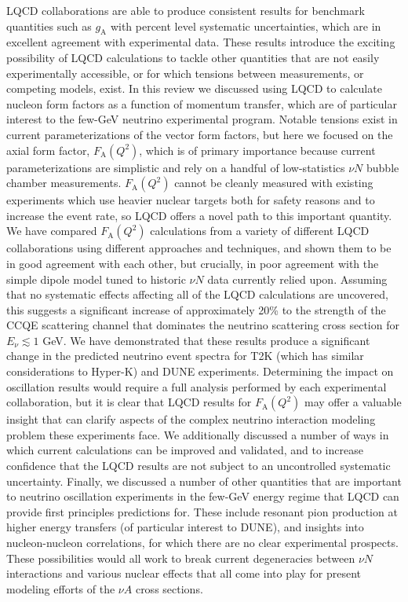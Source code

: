 LQCD collaborations are able to produce consistent results for benchmark quantities such as $g_{\mathrm{A}}$ with percent level systematic uncertainties, which are in excellent agreement with experimental data.
These results introduce the exciting possibility of LQCD calculations to tackle other quantities that are not easily experimentally accessible, or for which tensions between measurements, or competing models, exist.
In this review we discussed using LQCD to calculate nucleon form factors as a function of momentum transfer, which are of particular interest to the few-GeV neutrino experimental program.
Notable tensions exist in current parameterizations of the vector form factors, but here we focused on the axial form factor, $F_{\mathrm{A}}(Q^2)$, which is of primary importance because current parameterizations are simplistic and rely on a handful of low-statistics $\nu N$ bubble chamber measurements.
$F_{\mathrm{A}}(Q^2)$ cannot be cleanly measured with existing experiments which use heavier nuclear targets both for safety reasons and to increase the event rate, so LQCD offers a novel path to this important quantity.
We have compared $F_{\mathrm{A}}(Q^2)$ calculations from a variety of different LQCD collaborations using different approaches and techniques, and shown them to be in good agreement with each other, but crucially, in poor agreement with the simple dipole model tuned to historic $\nu N$ data currently relied upon.
Assuming that no systematic effects affecting all of the LQCD calculations are uncovered, this suggests a significant increase of approximately 20\% to the strength of the CCQE scattering channel that dominates the neutrino scattering cross section for $E_{\nu} \lesssim 1$ GeV.
We have demonstrated that these results produce a significant change in the predicted neutrino event spectra for T2K (which has similar considerations to Hyper-K) and DUNE experiments.
Determining the impact on oscillation results would require a full analysis performed by each experimental collaboration, but it is clear that LQCD results for $F_{\mathrm{A}}(Q^2)$ may offer a valuable insight that can clarify aspects of the complex neutrino interaction modeling problem these experiments face.
We additionally discussed a number of ways in which current calculations can be improved and validated, and to increase confidence that the LQCD results are not subject to an uncontrolled systematic uncertainty.
Finally, we discussed a number of other quantities that are important to neutrino oscillation experiments in the few-GeV energy regime that LQCD can provide first principles predictions for.
These include resonant pion production at higher energy transfers (of particular interest to DUNE), and insights into nucleon-nucleon correlations, for which there are no clear experimental prospects.
These possibilities would all work to break current degeneracies between $\nu N$ interactions and various nuclear effects that all come into play for present modeling efforts of the $\nu A$ cross sections.

